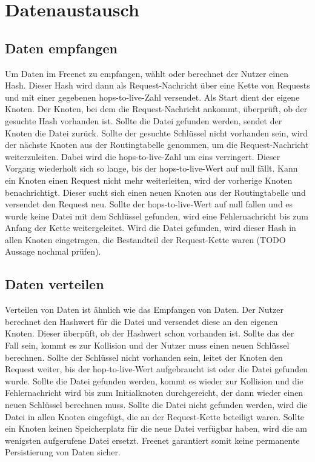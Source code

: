 \section{Datenaustausch}
\subsection{Daten empfangen}
Um Daten im Freenet zu empfangen, wählt oder berechnet der Nutzer einen Hash.
Dieser Hash wird dann als Request-Nachricht über eine Kette von Requests und
mit einer gegebenen hops-to-live-Zahl versendet. Als Start dient der eigene Knoten.
Der Knoten, bei dem die Request-Nachricht ankommt, überprüft, ob der gesuchte
Hash vorhanden ist. Sollte die Datei gefunden werden, sendet der Knoten
die Datei zurück. Sollte der gesuchte Schlüssel nicht vorhanden sein, wird
der nächste Knoten aus der Routingtabelle genommen, um die Request-Nachricht
weiterzuleiten. Dabei wird die hops-to-live-Zahl um eins verringert. Dieser
Vorgang wiederholt sich so lange, bis der hops-to-live-Wert auf null fällt.
Kann ein Knoten einen Request nicht mehr weiterleiten, wird der vorherige
Knoten benachrichtigt. Dieser sucht sich einen neuen Knoten aus der
Routingtabelle und versendet den Request neu. Sollte der hops-to-live-Wert auf
null fallen und es wurde keine Datei mit dem Schlüssel gefunden, wird eine
Fehlernachricht bis zum Anfang der Kette weitergeleitet.
Wird die Datei gefunden, wird dieser Hash in allen Knoten eingetragen, die
Bestandteil der Request-Kette waren (TODO Aussage nochmal prüfen).

\subsection{Daten verteilen}
Verteilen von Daten ist ähnlich wie das Empfangen von Daten. Der Nutzer
berechnet den Hashwert für die Datei und versendet diese an den eigenen Knoten.
Dieser überpüft, ob der Hashwert schon vorhanden ist. Sollte das der Fall sein,
kommt es zur Kollision und der Nutzer muss einen neuen Schlüssel berechnen.
Sollte der Schlüssel nicht vorhanden sein, leitet der Knoten den Request
weiter, bis der hop-to-live-Wert aufgebraucht ist oder die Datei gefunden
wurde. Sollte die Datei gefunden werden, kommt es wieder zur Kollision und die
Fehlernachricht wird bis zum Initialknoten durchgereicht, der dann wieder einen
neuen Schlüssel berechnen muss. Sollte die Datei nicht gefunden werden, wird
die Datei in allen Knoten eingefügt, die an der Request-Kette beteiligt waren.
Sollte ein Knoten keinen Speicherplatz für die neue Datei verfügbar haben,
wird die am wenigsten aufgerufene Datei ersetzt. Freenet garantiert somit keine
permanente Persistierung von Daten sicher.

